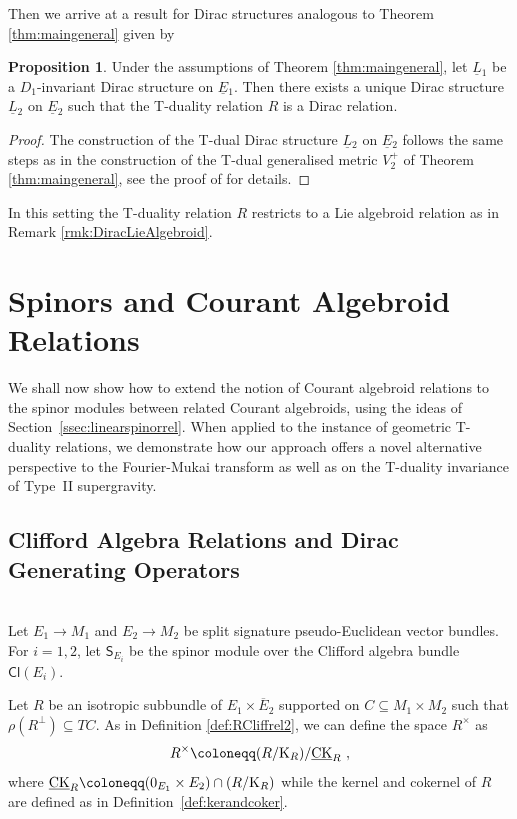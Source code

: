\documentclass[a4paper, reqno, 11pt]{amsart}
\numberwithin{equation}{section}
\theoremstyle{definition}
\newtheorem{proposition}[equation]{Proposition}
\newcommand{\red}[1]{\underline{#1}}
\newcommand{\Cl}{\mathsf{Cl}}
\newcommand{\sfS}{{\mathsf{S}}}
\theoremstyle{remark}
\begin{document}
Then we arrive at a result for Dirac structures analogous to Theorem \ref{thm:maingeneral} given by

\begin{proposition} \label{prop:TdualDirac}
    Under the assumptions of Theorem \ref{thm:maingeneral}, let $\red L{}_1$ be a $D_1$-invariant Dirac structure on $\red E{}_1$. Then there exists a unique Dirac structure $\red L{}_2$ on $\red E{}_2$ such that the T-duality relation $R$ is a Dirac relation.
\end{proposition}

\begin{proof}
    The construction of the T-dual Dirac structure $\red L{}_2$ on $\red E{}_2$ follows the same steps as in the construction of the T-dual generalised metric $V_2^+$ of Theorem \ref{thm:maingeneral}, see the proof of \cite[Theorem~5.27]{DeFraja:2023fhe} for details. 
\end{proof}

In this setting the T-duality relation $R$ restricts to a Lie algebroid relation as in Remark \ref{rmk:DiracLieAlgebroid}.

\medskip

\section{Spinors and Courant Algebroid Relations} \label{sect:section5}

We shall now show how to extend the notion of Courant algebroid relations to the spinor modules between related Courant algebroids, using the ideas of Section~\ref{ssec:linearspinorrel}. When applied to the instance of geometric T-duality relations, we demonstrate how our approach offers a novel alternative perspective to the Fourier-Mukai transform as well as on the T-duality invariance of Type~II supergravity.

\medskip

\subsection{Clifford Algebra Relations and Dirac Generating Operators}~\\[5pt]
\label{sub:CliffordDGO}
Let $E_1 \to M_1$ and $E_2 \to M_2$ be split signature pseudo-Euclidean vector bundles. For $i=1,2$, let $\sfS_{E_i}$ be the spinor module over the Clifford algebra bundle $\Cl(E_i)$.

Let $R$ be an isotropic subbundle of $E_1 \times \overline{E}_2$ supported on $C \subseteq M_1 \times M_2$ such that $\rho(R^\perp) \subseteq TC$. As in Definition \ref{def:RCliffrel2}, we can define the space $R^\times$ as
\begin{align}\label{eq:Rtimes}
    R^\times \coloneqq (R/ {\rm K}_R)/ \underline{\rm CK}_R \ , 
\end{align}
where $\underline{{\rm CK}}_R \coloneqq (0_{E_1} \times E_2) \cap (R / {\rm K}_R)$
while the kernel and cokernel of $R$ are defined as in Definition~\ref{def:kerandcoker}.
\end{document}
